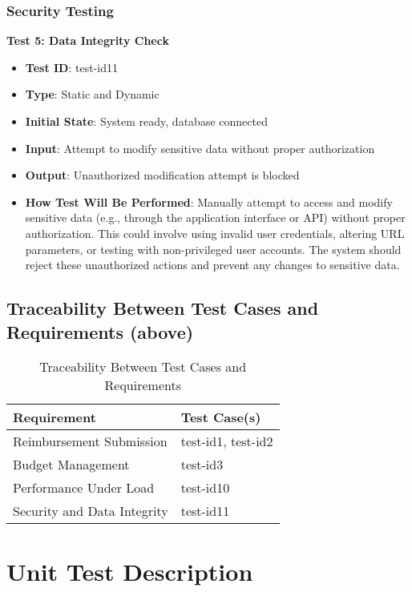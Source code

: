 \documentclass[12pt, titlepage]{article}
\begin{document}
\subsubsection{Security Testing}

\textbf{Test 5: Data Integrity Check}
\begin{itemize}
    \item \textbf{Test ID}: test-id11
    \item \textbf{Type}: Static and Dynamic
    \item \textbf{Initial State}: System ready, database connected
    \item \textbf{Input}: Attempt to modify sensitive data without proper authorization
    \item \textbf{Output}: Unauthorized modification attempt is blocked
    \item \textbf{How Test Will Be Performed}: Manually attempt to access and modify sensitive data (e.g., through the application interface or API) without proper authorization. This could involve using invalid user credentials, altering URL parameters, or testing with non-privileged user accounts. The system should reject these unauthorized actions and prevent any changes to sensitive data.

\end{itemize}

\subsection{Traceability Between Test Cases and Requirements (above)}

\begin{table}[h]
  \centering
  \begin{tabular}{|l|l|}
      \hline
      \textbf{Requirement} & \textbf{Test Case(s)} \\
      \hline
      Reimbursement Submission & test-id1, test-id2 \\
      Budget Management & test-id3 \\
      Performance Under Load & test-id10 \\
      Security and Data Integrity & test-id11 \\
      \hline
  \end{tabular}
  \caption{Traceability Between Test Cases and Requirements}
\end{table}

\section{Unit Test Description}
\end{document}
